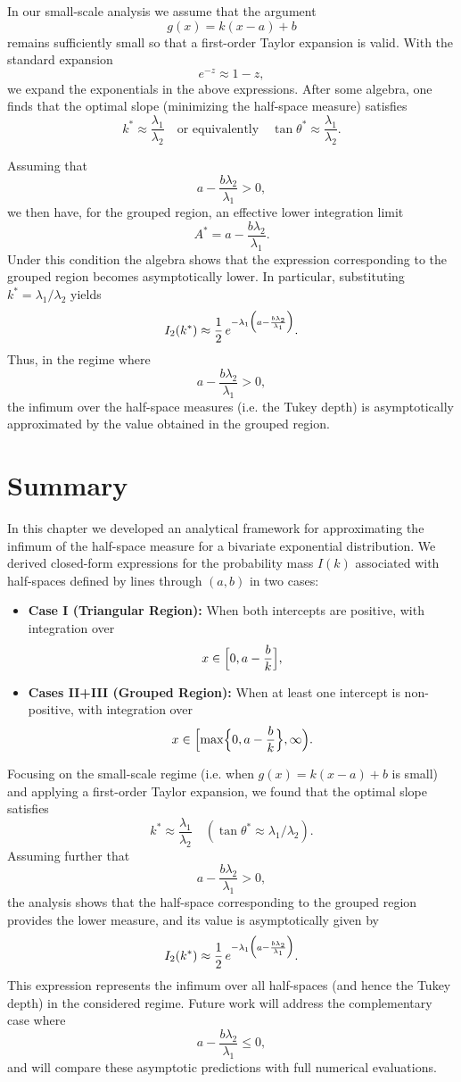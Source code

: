 In our small-scale analysis we assume that the argument
\[
g(x)=k(x-a)+b
\]
remains sufficiently small so that a first-order Taylor expansion is valid. With the standard expansion
\[
e^{-z}\approx 1-z,
\]
we expand the exponentials in the above expressions. After some algebra, one finds that the optimal slope (minimizing the half-space measure) satisfies
\[
k^*\approx\frac{\lambda_1}{\lambda_2}\quad \text{or equivalently}\quad \tan\theta^*\approx\frac{\lambda_1}{\lambda_2}.
\]

Assuming that
\[
a-\frac{b\lambda_2}{\lambda_1}>0,
\]
we then have, for the grouped region, an effective lower integration limit
\[
A^*=a-\frac{b\lambda_2}{\lambda_1}.
\]
Under this condition the algebra shows that the expression corresponding to the grouped region becomes asymptotically lower. In particular, substituting \(k^*=\lambda_1/\lambda_2\) yields
\[
I_2(k^*)\approx \frac{1}{2}\,e^{-\lambda_1\Bigl(a-\frac{b\lambda_2}{\lambda_1}\Bigr)}.
\]
Thus, in the regime where
\[
a-\frac{b\lambda_2}{\lambda_1}>0,
\]
the infimum over the half-space measures (i.e. the Tukey depth) is asymptotically approximated by the value obtained in the grouped region.

\section{Summary}

In this chapter we developed an analytical framework for approximating the infimum of the half-space measure for a bivariate exponential distribution. We derived closed-form expressions for the probability mass \(I(k)\) associated with half-spaces defined by lines through \((a,b)\) in two cases:
\begin{itemize}
    \item \textbf{Case I (Triangular Region):} When both intercepts are positive, with integration over
    \[
    x\in\Bigl[0,a-\frac{b}{k}\Bigr],
    \]
    \item \textbf{Cases II+III (Grouped Region):} When at least one intercept is non-positive, with integration over
    \[
    x\in\Bigl[\max\Bigl\{0,a-\frac{b}{k}\Bigr\},\infty\Bigr).
    \]
\end{itemize}

Focusing on the small-scale regime (i.e. when \(g(x)=k(x-a)+b\) is small) and applying a first-order Taylor expansion, we found that the optimal slope satisfies
\[
k^*\approx\frac{\lambda_1}{\lambda_2}\quad (\tan\theta^*\approx\lambda_1/\lambda_2).
\]
Assuming further that
\[
a-\frac{b\lambda_2}{\lambda_1}>0,
\]
the analysis shows that the half-space corresponding to the grouped region provides the lower measure, and its value is asymptotically given by
\[
I_2(k^*)\approx \frac{1}{2}\,e^{-\lambda_1\Bigl(a-\frac{b\lambda_2}{\lambda_1}\Bigr)}.
\]
This expression represents the infimum over all half-spaces (and hence the Tukey depth) in the considered regime. Future work will address the complementary case where
\[
a-\frac{b\lambda_2}{\lambda_1}\le 0,
\]
and will compare these asymptotic predictions with full numerical evaluations.
